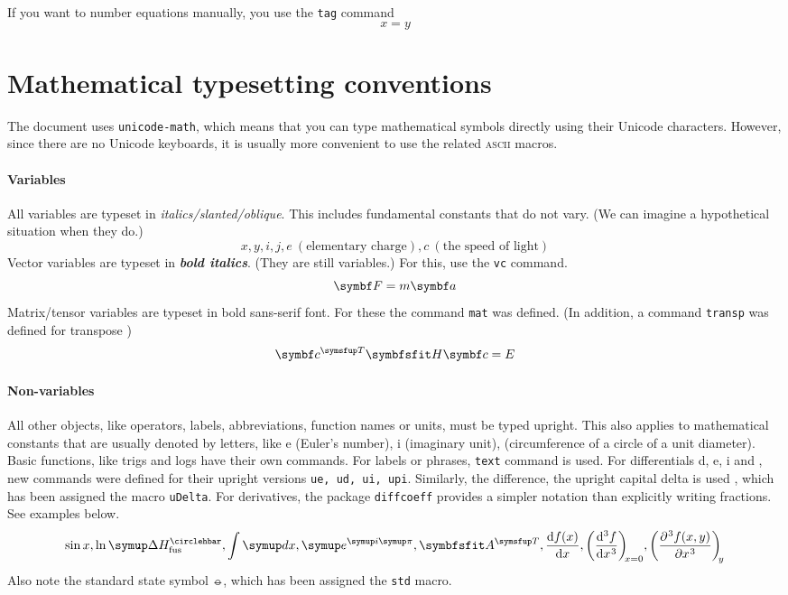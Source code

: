 \documentclass{article}
\begin{document}
If you want to number equations manually, you use the \texttt{tag} command
\[
x=y
\tag{4}
\]

\section{Mathematical typesetting conventions}
The document uses \texttt{unicode-math}, which means that you can type mathematical symbols directly using their Unicode characters. However, since there are no Unicode keyboards, it is usually more convenient to use the related \textsc{ascii} macros.

\paragraph{Variables} All variables are typeset in \textit{italics/slanted/oblique}. This includes fundamental constants that do not vary. (We can imagine a hypothetical situation when they do.)
\[
x, y, i, j, e\ (\text{elementary charge}), c\ (\text{the speed of light})
\]
Vector variables are typeset in \textbf{\textit{bold italics}}. (They are still variables.) For this, use the \texttt{vc} command.
\[
\vc{F} = m \vc{a}
\]
Matrix/tensor variables are typeset in bold sans-serif font. For these the command \texttt{mat} was defined. (In addition, a command \texttt{transp} was defined for transpose \transp)
\[
\vc{c}^\transp \mat{H} \vc{c} = E
\]
\paragraph{Non-variables} All other objects, like operators, labels, abbreviations, function names or units, must be typed upright. This also applies to mathematical constants that are usually denoted by letters, like e (Euler's number), i (imaginary unit), \upi (circumference of a circle of a unit diameter). Basic functions, like trigs and logs have their own commands. For labels or phrases, \texttt{text} command is used. For differentials d, e, i and \upi, new commands were defined for their upright versions \texttt{ue, ud, ui, upi}. Similarly, the difference, the upright capital delta is used \uDelta, which has been assigned the macro \texttt{uDelta}. For derivatives, the package \texttt{diffcoeff} provides a simpler notation than explicitly writing fractions. See examples below.
\[
\sin x, \ln \uDelta H_\text{fus}^\std,\int \ud x, \ue^{\ui \upi}, \mat{A}^\transp, \diff{f(x)}{x}, \diff[3]{f}{x}[x=0], \diffp[3]{f(x,y)}{x}[y]
\]
Also note the standard state symbol $\circlehbar$, which has been assigned the \texttt{std} macro.
\end{document}
